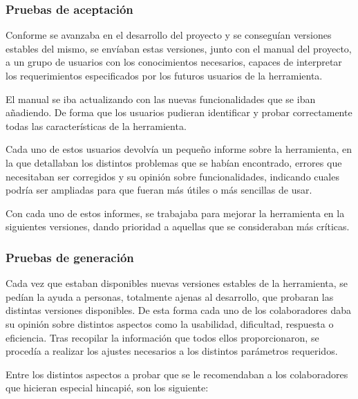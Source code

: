 \documentclass[a4paper,12pt]{article}
\begin{document}
\subsubsection{Pruebas de aceptación}

Conforme se avanzaba en el desarrollo del proyecto y se conseguían versiones estables del mismo, se
envíaban estas versiones, junto con el manual del proyecto, a un grupo de usuarios con los conocimientos
necesarios, capaces de interpretar los requerimientos especificados por los futuros usuarios de la herramienta.

El manual se iba actualizando con las nuevas funcionalidades que se iban añadiendo. De forma que
los usuarios pudieran identificar y probar correctamente todas las características de la herramienta.

Cada uno de estos usuarios devolvía un pequeño informe sobre la herramienta, en la que detallaban los distintos
problemas que se habían encontrado, errores que necesitaban ser corregidos y su opinión sobre
funcionalidades, indicando cuales podría ser ampliadas para que fueran más útiles o más sencillas de usar.

Con cada uno de estos informes, se trabajaba para mejorar la herramienta en la siguientes versiones, dando
prioridad a aquellas que se consideraban más críticas.

\subsubsection{Pruebas de generación}

Cada vez que estaban disponibles nuevas versiones estables de la herramienta, se pedían la ayuda a personas,
totalmente ajenas al desarrollo, que probaran las distintas versiones disponibles. De esta forma cada uno
de los colaboradores daba su opinión sobre  distintos aspectos como la usabilidad, dificultad, respuesta o eficiencia.
Tras recopilar la información que todos ellos proporcionaron, se procedía a realizar los ajustes
necesarios a los distintos parámetros requeridos.

Entre los distintos aspectos a probar que se le recomendaban a los
colaboradores que hicieran especial hincapié, son los siguiente:
\end{document}
